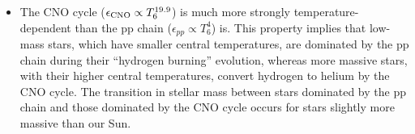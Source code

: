 \documentclass[a4paper,10pt]{article}
\begin{document}
\begin{itemize}
    \item The CNO cycle ($\epsilon_{\rm CNO}\propto T_6^{19.9}$) is much more strongly temperature-dependent than the pp chain ($\epsilon_{pp}\propto T_6^4$) is. This property implies that low-mass stars, which have smaller central temperatures, are dominated by the pp chain during their ``hydrogen burning'' evolution, whereas more massive stars, with their higher central temperatures, convert hydrogen to helium by the CNO cycle. The transition in stellar mass between stars dominated by the pp chain and those dominated by the CNO cycle occurs for stars slightly more massive than our Sun.
    \end{itemize}
\end{document}
